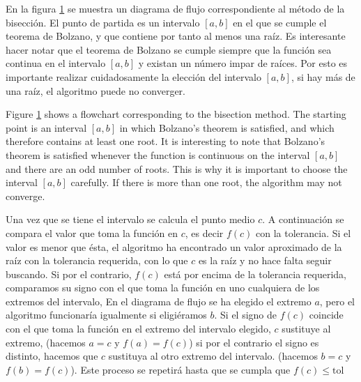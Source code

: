 \begin{figure}[h]
\begin{subfigure}{0.45\textwidth}
\end{subfigure}
\label{fig:dfbisec}
\end{figure}

\begin{paracol}{2}

En la figura \ref{fig:dfbisec} se muestra un diagrama de flujo correspondiente al método de la bisección. El punto de partida es un intervalo $[a,b]$ en el que se cumple el teorema de Bolzano, y que contiene por tanto al menos una raíz. Es interesante hacer notar que el teorema de Bolzano se cumple siempre que la función sea continua en el intervalo $[a,b]$ y existan un número impar de raíces. Por esto es importante realizar cuidadosamente la elección del intervalo $[a,b]$, si hay más de una raíz, el algoritmo puede no converger.

\switchcolumn

Figure \ref{fig:dfbisec} shows a flowchart corresponding to the bisection method. The starting point is an interval $[a,b]$ in which Bolzano's theorem is satisfied, and which therefore contains at least one root. It is interesting to note that Bolzano's theorem is satisfied whenever the function is continuous on the interval $[a,b]$ and there are an odd number of roots. This is why it is important to choose the interval $[a,b]$ carefully. If there is more than one root, the algorithm may not converge.

\switchcolumn
 Una vez que se tiene el intervalo se calcula el punto medio $c$. A continuación se compara el valor que toma la función en $c$, es decir $f(c)$ con la tolerancia. Si el valor es menor que ésta, el algoritmo ha encontrado un valor aproximado de la raíz con la tolerancia requerida, con lo que $c$ es la raíz y no hace falta seguir buscando. Si por el contrario, $f(c)$ está por encima de la tolerancia requerida, comparamos su signo con el que toma la función en uno cualquiera de los extremos del intervalo, En el diagrama de flujo se ha elegido el extremo $a$, pero el algoritmo funcionaría igualmente si eligiéramos $b$. Si el signo de $f(c)$ coincide con el que toma la función en el extremo del intervalo elegido, $c$ sustituye al extremo, (hacemos $a=c$ y $f(a)=f(c)$) si por el contrario el signo es distinto, hacemos que $c$ sustituya al otro extremo del intervalo. (hacemos $b=c$ y $f(b)=f(c)$). Este proceso se repetirá hasta que se cumpla que $f(c)\le \text{tol}$ 


\end{paracol}
